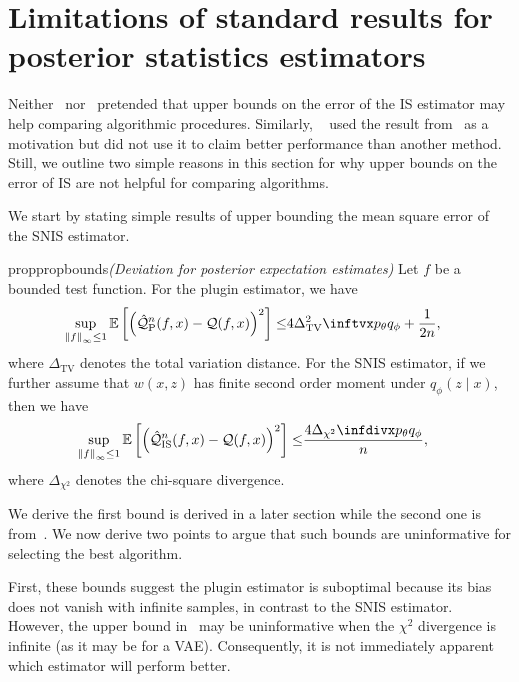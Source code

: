 \section{Limitations of standard results for posterior statistics estimators}
\label{app:err_simple_bounds}

Neither~\cite{Chatterjee2018} nor~\cite{Agapiou2017} pretended that upper bounds on the error of the IS estimator may help comparing algorithmic procedures. Similarly, ~\cite{le2018revisiting} used the result from~\cite{Chatterjee2018} as a motivation but did not use it to claim better performance than another method. Still, we outline two simple reasons in this section for why upper bounds on the error of IS are not helpful for comparing algorithms. 

We start by stating simple results of upper bounding the mean square error of the SNIS estimator. 
\begin{restatable}{prop}{propbounds}\label{prop:simple_bounds}\emph{(Deviation for posterior expectation estimates)} Let $f$ be a bounded test function. For the plugin estimator, we have
\begin{align}
\label{eq:up_plugin}
    \sup_{\norm{f}_\infty \leq 1}\mathbb{E}\left[ \left( \hat{\mathcal{Q}}^n_{\textrm{P}}(f, x) -  \mathcal{Q}(f, x) \right)^2 \right]     \leq & 4\tvsq{p_\theta}{q_\phi} + \frac{1}{2n},
\end{align}
where $\Delta_\textrm{TV}$ denotes the total variation distance. For the SNIS estimator, if we further assume that $w(x, z)$ has finite second order moment under $q_\phi(z \mid x)$, then we have
\begin{align}
\label{eq:up_snis}
    \sup_{\norm{f}_\infty \leq 1}\mathbb{E}\left[ \left( \hat{\mathcal{Q}}^n_{\textrm{IS}}(f, x) -  \mathcal{Q}(f, x) \right)^2 \right] \leq & \frac{4\chidiv{p_\theta}{q_\phi}}{n},
\end{align}
where $\Delta_{\chi^2}$ denotes the chi-square divergence.
\end{restatable}
We derive the first bound is derived in a later section while the second one is from~\cite{Agapiou2017}. We now derive two points to argue that such bounds are uninformative for selecting the best algorithm. 

First, these bounds suggest the plugin estimator is suboptimal because its bias does not vanish with infinite samples, in contrast to the SNIS estimator. 
However, the upper bound in~\cite{Agapiou2017} may be uninformative when the $\chi^2$ divergence is infinite (as it may be for a VAE). Consequently, it is not immediately apparent which estimator will perform better. 

